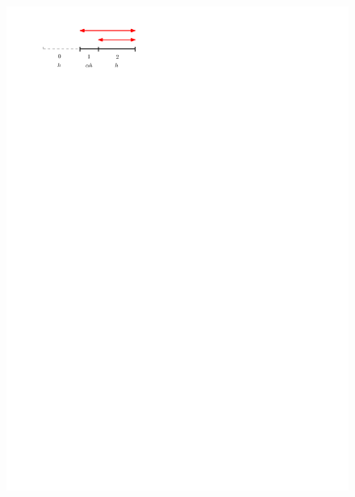 \begin{figure}
    \centering
    \includegraphics{figs/consistency.pdf}
    \caption{}
    \label{fig:consistency}
\end{figure}


